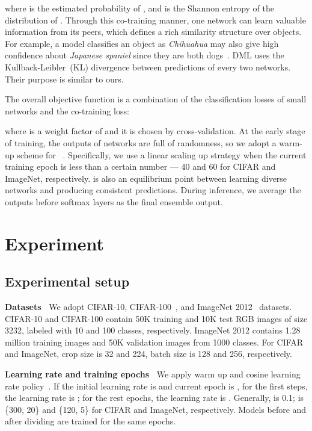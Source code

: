 \documentclass[lettersize,journal]{IEEEtran}
\begin{document}
where  is the estimated probability of ,
and  is the Shannon entropy of the 
distribution of . Through this co-training manner,
one network can learn valuable information from its peers, which
defines a rich similarity structure over objects.
For example, a model classifies an object as \textit{Chihuahua}
may also give high confidence about \textit{Japanese spaniel} since
they are both dogs~\cite{2015_HintonKD}.
DML uses the Kullback-Leibler~(KL)
divergence between predictions of every two networks.
Their purpose is similar to ours.


The overall objective function is
a combination of the
classification losses of small networks and the co-training loss:

where  is a weight factor of 
and it is chosen by cross-validation.
At the early stage of training, the outputs
of networks are full of randomness, 
so we adopt a warm-up scheme for
~\cite{2017_conf/iclr/LaineA17,2018_QiaoSZWY18}.
Specifically, we use a linear scaling up strategy when
the current training epoch is less than a certain number ---
40 and 60 for CIFAR and ImageNet, respectively.    
 is also an equilibrium point between
learning diverse networks and producing consistent predictions.
During inference, we average the outputs before
softmax layers as the final ensemble output.


\section{Experiment}

\subsection{Experimental setup} \label{sec_exp_setup}

\noindent\textbf{Datasets~} 
We adopt CIFAR-10, CIFAR-100~\cite{cifar}, and
ImageNet 2012~\cite{ImageNet} datasets.
CIFAR-10 and CIFAR-100 contain
50K training and 10K test RGB images of size 3232,
labeled with 10 and 100 classes, respectively.
ImageNet 2012 contains 1.28 million training images
and 50K validation images from 1000 classes.
For CIFAR and ImageNet, crop size is 32 and 224,
batch size is 128 and 256, 
respectively.

\noindent\textbf{Learning rate and training epochs~}
We apply warm up and
cosine learning rate policy~\cite{2017_PriyaGoyal,2018_bags_of_tricks}.
If the initial learning rate is  and current epoch is ,
for the first  steps, the learning rate is 
;
for the rest epochs, the learning rate is
.
Generally,  is 0.1;  is
\{300, 20\} and \{120, 5\} for CIFAR and ImageNet, respectively.
Models before and after dividing are trained for the same epochs.
\end{document}
